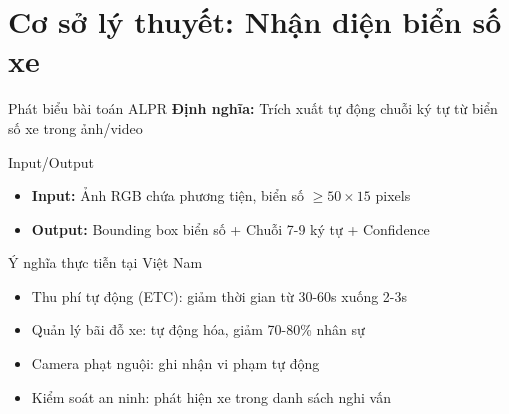 \section{Cơ sở lý thuyết: Nhận diện biển số xe}

\begin{frame}{Phát biểu bài toán ALPR}
    \textbf{Định nghĩa:} Trích xuất tự động chuỗi ký tự từ biển số xe trong ảnh/video
    
    \begin{block}{Input/Output}
    \begin{itemize}
        \item \textbf{Input:} Ảnh RGB chứa phương tiện, biển số $\geq 50 \times 15$ pixels
        \item \textbf{Output:} Bounding box biển số + Chuỗi 7-9 ký tự + Confidence
    \end{itemize}
    \end{block}
    
    \begin{block}{Ý nghĩa thực tiễn tại Việt Nam}
    \begin{itemize}
        \item Thu phí tự động (ETC): giảm thời gian từ 30-60s xuống 2-3s
        \item Quản lý bãi đỗ xe: tự động hóa, giảm 70-80\% nhân sự
        \item Camera phạt nguội: ghi nhận vi phạm tự động
        \item Kiểm soát an ninh: phát hiện xe trong danh sách nghi vấn
    \end{itemize}
    \end{block}
\end{frame}

